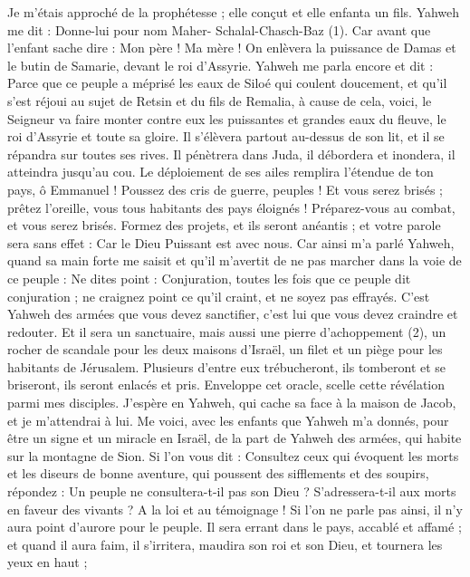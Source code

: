 \begin{multicols}{2}
Je m’étais approché de la prophétesse ; elle conçut et elle enfanta un fils. Yahweh me dit : Donne-lui pour nom Maher- Schalal-Chasch-Baz (1).
Car avant que l'enfant sache dire : Mon père ! Ma mère ! On enlèvera la puissance de Damas et le butin de Samarie, devant le roi d'Assyrie.
Yahweh me parla encore et dit :
Parce que ce peuple a méprisé les eaux de Siloé qui coulent doucement, et qu'il s'est réjoui au sujet de Retsin et du fils de Remalia,
à cause de cela, voici, le Seigneur va faire monter contre eux les puissantes et grandes eaux du fleuve, le roi d'Assyrie et toute sa gloire. Il s’élèvera partout au-dessus de son lit, et il se répandra sur toutes ses rives.
Il pénètrera dans Juda, il débordera et inondera, il atteindra jusqu’au cou. Le déploiement de ses ailes remplira l’étendue de ton pays, ô Emmanuel !
Poussez des cris de guerre, peuples ! Et vous serez brisés ; prêtez l'oreille, vous tous habitants des pays éloignés ! Préparez-vous au combat, et vous serez brisés.
Formez des projets, et ils seront anéantis ; et votre parole sera sans effet : Car le Dieu Puissant est avec nous.
Car ainsi m'a parlé Yahweh, quand sa main forte me saisit et qu’il m’avertit de ne pas marcher dans la voie de ce peuple :
Ne dites point : Conjuration, toutes les fois que ce peuple dit conjuration ; ne craignez point ce qu'il craint, et ne soyez pas effrayés.
C’est Yahweh des armées que vous devez sanctifier, c’est lui que vous devez craindre et redouter.
Et il sera un sanctuaire, mais aussi une pierre d'achoppement (2), un rocher de scandale pour les deux maisons d'Israël, un filet et un piège pour les habitants de Jérusalem.
Plusieurs d’entre eux trébucheront, ils tomberont et se briseront, ils seront enlacés et pris.
Enveloppe cet oracle, scelle cette révélation parmi mes disciples.
J’espère en Yahweh, qui cache sa face à la maison de Jacob, et je m'attendrai à lui.
Me voici, avec les enfants que Yahweh m'a donnés, pour être un signe et un miracle en Israël, de la part de Yahweh des armées, qui habite sur la montagne de Sion.
Si l’on vous dit : Consultez ceux qui évoquent les morts et les diseurs de bonne aventure, qui poussent des sifflements et des soupirs, répondez : Un peuple ne consultera-t-il pas son Dieu ? S’adressera-t-il aux morts en faveur des vivants ?
A la loi et au témoignage ! Si l’on ne parle pas ainsi, il n’y aura point d’aurore pour le peuple.
Il sera errant dans le pays, accablé et affamé ; et quand il aura faim, il s’irritera, maudira son roi et son Dieu, et tournera les yeux en haut ;

\end{multicols}
